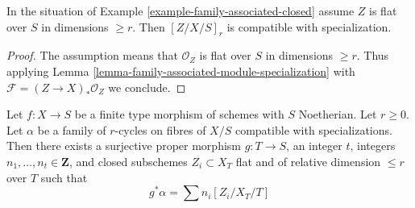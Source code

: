 \begin{lemma}
\label{lemma-family-associated-closed-specialization}
In the situation of Example \ref{example-family-associated-closed}
assume $Z$ is flat over $S$ in dimensions $\geq r$.
Then $[Z/X/S]_r$ is compatible with specialization.
\end{lemma}

\begin{proof}
The assumption means that $\mathcal{O}_Z$ is flat over $S$ in
dimensions $\geq r$. Thus applying
Lemma \ref{lemma-family-associated-module-specialization}
with $\mathcal{F} = (Z \to X)_*\mathcal{O}_Z$ we conclude.
\end{proof}

\begin{lemma}
\label{lemma-get-cycles}
Let $f : X \to S$ be a finite type morphism of schemes with $S$ Noetherian.
Let $r \geq 0$. Let $\alpha$ be a family of $r$-cycles on fibres of $X/S$
compatible with specializations. Then there exists a surjective proper
morphism $g : T \to S$, an integer $t$, integers
$n_1, \ldots, n_t \in \mathbf{Z}$, and closed subschemes
$Z_i \subset X_T$ flat and of relative dimension $\leq r$ over $T$ such that
$$
g^*\alpha = \sum n_i [Z_i/X_T/T]
$$
\end{lemma}

